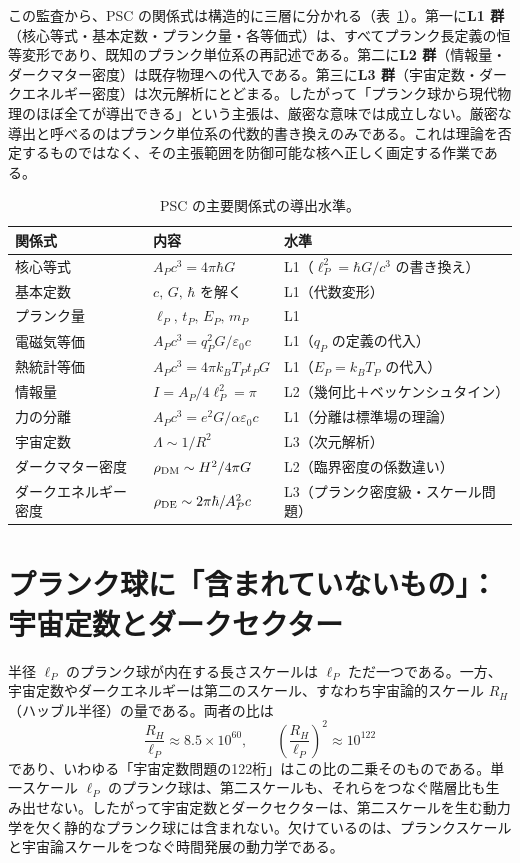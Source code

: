 \documentclass[11pt,a4paper]{article}
\newcommand{\eP}{\ell_P}
\begin{document}
この監査から、PSC の関係式は構造的に三層に分かれる（表~\ref{tab:audit}）。第一に\textbf{L1 群}（核心等式・基本定数・プランク量・各等価式）は、すべてプランク長定義の恒等変形であり、既知のプランク単位系の再記述である。第二に\textbf{L2 群}（情報量・ダークマター密度）は既存物理への代入である。第三に\textbf{L3 群}（宇宙定数・ダークエネルギー密度）は次元解析にとどまる。したがって「プランク球から現代物理のほぼ全てが導出できる」という主張は、厳密な意味では成立しない。厳密な導出と呼べるのはプランク単位系の代数的書き換えのみである。これは理論を否定するものではなく、その主張範囲を防御可能な核へ正しく画定する作業である。

\begin{table}[t]
\centering
\small
\begin{tabular}{@{}lll@{}}
\toprule
関係式 & 内容 & 水準 \\
\midrule
核心等式 & $A_P c^3 = 4\pi\hbar G$ & L1（$\eP^2=\hbar G/c^3$ の書き換え）\\
基本定数 & $c,\,G,\,\hbar$ を解く & L1（代数変形）\\
プランク量 & $\eP,\,t_P,\,E_P,\,m_P$ & L1 \\
電磁気等価 & $A_P c^3 = q_P^2 G/\varepsilon_0 c$ & L1（$q_P$ の定義の代入）\\
熱統計等価 & $A_P c^3 = 4\pi k_B T_P t_P G$ & L1（$E_P=k_B T_P$ の代入）\\
情報量 & $I = A_P/4\eP^2 = \pi$ & L2（幾何比＋ベッケンシュタイン）\\
力の分離 & $A_P c^3 = e^2 G/\alpha\varepsilon_0 c$ & L1（分離は標準場の理論）\\
宇宙定数 & $\Lambda \sim 1/R^2$ & L3（次元解析）\\
ダークマター密度 & $\rho_{\rm DM}\sim H^2/4\pi G$ & L2（臨界密度の係数違い）\\
ダークエネルギー密度 & $\rho_{\rm DE}\sim 2\pi\hbar/A_P^2 c$ & L3（プランク密度級・スケール問題）\\
\bottomrule
\end{tabular}
\caption{PSC の主要関係式の導出水準。}
\label{tab:audit}
\end{table}

\section{プランク球に「含まれていないもの」：宇宙定数とダークセクター}
半径 $\eP$ のプランク球が内在する長さスケールは $\eP$ ただ一つである。一方、宇宙定数やダークエネルギーは第二のスケール、すなわち宇宙論的スケール $R_H$（ハッブル半径）の量である。両者の比は
\begin{equation}
\frac{R_H}{\eP}\approx 8.5\times10^{60},\qquad \left(\frac{R_H}{\eP}\right)^2\approx 10^{122}
\end{equation}
であり、いわゆる「宇宙定数問題の122桁」はこの比の二乗そのものである。単一スケール $\eP$ のプランク球は、第二スケールも、それらをつなぐ階層比も生み出せない。したがって宇宙定数とダークセクターは、第二スケールを生む動力学を欠く静的なプランク球には含まれない。欠けているのは、プランクスケールと宇宙論スケールをつなぐ時間発展の動力学である。
\end{document}
